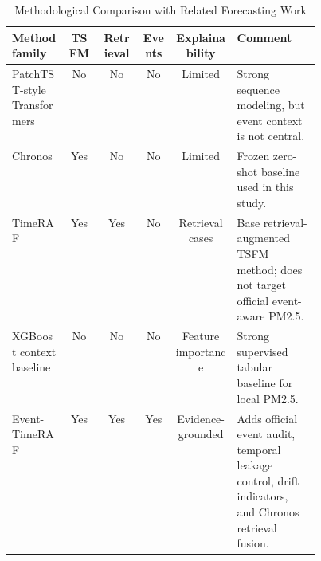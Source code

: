 \begin{table}[!t]
\centering
\caption{Methodological Comparison with Related Forecasting Work}
\label{tab:literature_positioning}
\begin{tabular}{p{0.18\linewidth}ccccp{0.27\linewidth}}
\toprule
Method family & TSFM & Retrieval & Events & Explainability & Comment \\
\midrule
PatchTST-style Transformers \cite{nie2023patchtst} & No & No & No & Limited &
Strong sequence modeling, but event context is not central. \\
Chronos \cite{ansari2024chronos} & Yes & No & No & Limited & Frozen
zero-shot baseline used in this study. \\
TimeRAF \cite{zhang2025timeraf} & Yes & Yes & No & Retrieval cases & Base
retrieval-augmented TSFM method; does not target official event-aware PM2.5. \\
XGBoost context baseline \cite{chen2016xgboost} & No & No & No & Feature
importance & Strong supervised tabular baseline for local PM2.5. \\
Event-TimeRAF & Yes & Yes & Yes & Evidence-grounded & Adds official event
audit, temporal leakage control, drift indicators, and Chronos retrieval fusion. \\
\bottomrule
\end{tabular}
\end{table}
